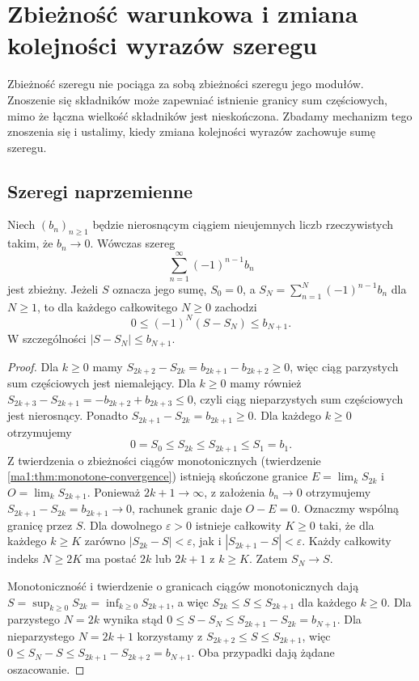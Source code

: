 \chapter{Zbieżność warunkowa i zmiana kolejności wyrazów szeregu}
\label{ma1:ch:conditional-series}

Zbieżność szeregu nie pociąga za sobą zbieżności szeregu jego modułów. Znoszenie się składników może zapewniać istnienie granicy sum częściowych, mimo że łączna wielkość składników jest nieskończona. Zbadamy mechanizm tego znoszenia się i ustalimy, kiedy zmiana kolejności wyrazów zachowuje sumę szeregu.

\section{Szeregi naprzemienne}
\begin{twierdzenie}
\label{ma1:thm:leibniz-series}
Niech $(b_n)_{n\ge1}$ będzie nierosnącym ciągiem nieujemnych liczb rzeczywistych takim, że $b_n\to0$. Wówczas szereg
\[
 \sum_{n=1}^\infty (-1)^{n-1}b_n
\]
jest zbieżny. Jeżeli $S$ oznacza jego sumę, $S_0=0$, a $S_N=\sum_{n=1}^N(-1)^{n-1}b_n$ dla $N\ge1$, to dla każdego całkowitego $N\ge0$ zachodzi
\[
 0\le(-1)^N(S-S_N)\le b_{N+1}.
\]
W szczególności $|S-S_N|\le b_{N+1}$.
\end{twierdzenie}
\begin{proof}
Dla $k\ge0$ mamy $S_{2k+2}-S_{2k}=b_{2k+1}-b_{2k+2}\ge0$, więc ciąg parzystych sum częściowych jest niemalejący. Dla $k\ge0$ mamy również $S_{2k+3}-S_{2k+1}=-b_{2k+2}+b_{2k+3}\le0$, czyli ciąg nieparzystych sum częściowych jest nierosnący. Ponadto $S_{2k+1}-S_{2k}=b_{2k+1}\ge0$. Dla każdego $k\ge0$ otrzymujemy
\[
 0=S_0\le S_{2k}\le S_{2k+1}\le S_1=b_1.
\]
Z twierdzenia o zbieżności ciągów monotonicznych (twierdzenie \ref{ma1:thm:monotone-convergence}) istnieją skończone granice $E=\lim_k S_{2k}$ i $O=\lim_k S_{2k+1}$. Ponieważ $2k+1\to\infty$, z założenia $b_n\to0$ otrzymujemy $S_{2k+1}-S_{2k}=b_{2k+1}\to0$, rachunek granic daje $O-E=0$. Oznaczmy wspólną granicę przez $S$. Dla dowolnego $\varepsilon>0$ istnieje całkowity $K\ge0$ taki, że dla każdego $k\ge K$ zarówno $|S_{2k}-S|<\varepsilon$, jak i $|S_{2k+1}-S|<\varepsilon$. Każdy całkowity indeks $N\ge2K$ ma postać $2k$ lub $2k+1$ z $k\ge K$. Zatem $S_N\to S$.

Monotoniczność i twierdzenie o granicach ciągów monotonicznych dają $S=\sup_{k\ge0}S_{2k}=\inf_{k\ge0}S_{2k+1}$, a więc $S_{2k}\le S\le S_{2k+1}$ dla każdego $k\ge0$. Dla parzystego $N=2k$ wynika stąd $0\le S-S_N\le S_{2k+1}-S_{2k}=b_{N+1}$. Dla nieparzystego $N=2k+1$ korzystamy z $S_{2k+2}\le S\le S_{2k+1}$, więc $0\le S_N-S\le S_{2k+1}-S_{2k+2}=b_{N+1}$. Oba przypadki dają żądane oszacowanie.
\end{proof}
